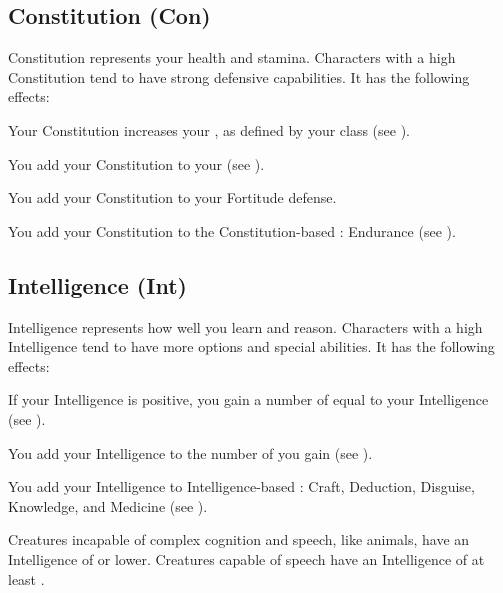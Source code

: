     \subsection{Constitution (Con)}\label{Constitution}
        {
            Constitution represents your health and stamina.
            Characters with a high Constitution tend to have strong defensive capabilities.
            It has the following effects:
            \begin{raggeditemize}
                \item Your Constitution increases your , as defined by your class (see ).
                \item You add your Constitution to your  (see ).
                \item You add your Constitution to your Fortitude defense.
                \item You add your Constitution to the Constitution-based : Endurance (see ).
            \end{raggeditemize}
        }

    \subsection{Intelligence (Int)}\label{Intelligence}
        {
            Intelligence represents how well you learn and reason.
            Characters with a high Intelligence tend to have more options and special abilities.
            It has the following effects:

            \begin{raggeditemize}
                \item If your Intelligence is positive, you gain a number of  equal to your Intelligence (see ).
                \item You add your Intelligence to the number of  you gain (see ).
                \item You add your Intelligence to Intelligence-based : Craft, Deduction, Disguise, Knowledge, and Medicine (see ).
            \end{raggeditemize}

            \par Creatures incapable of complex cognition and speech, like animals, have an Intelligence of  or lower.
            Creatures capable of speech have an Intelligence of at least .
        }

